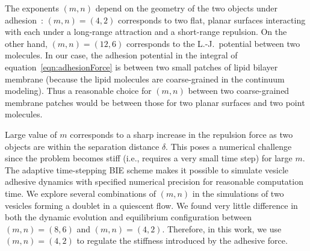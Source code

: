 \documentclass[prf,superscriptaddress,showpacs]{revtex4-1}
\begin{document}
The exponents $(m,n)$ depend on the geometry of the two objects under
adhesion~\cite{Book_IntermolecularSurfaceForces}: $(m,n)=(4,2)$
corresponds to two flat, planar surfaces interacting with each under a
long-range attraction and a short-range repulsion. On the other hand,
$(m,n) = (12,6)$ corresponds to the L.-J.~potential between two molecules.
In our case, the adhesion potential in the integral of
equation~\eqref{eqn:adhesionForce} is between two small patches of lipid
bilayer membrane (because the lipid molecules are coarse-grained in the
continuum modeling).  Thus a reasonable choice for $(m,n)$ between two
coarse-grained membrane patches would be between those for two planar
surfaces and two point molecules. 
 
Large value of $m$ corresponds to a sharp increase in the repulsion
force as two objects are within the separation distance $\delta$.  This
poses a numerical challenge since the problem becomes stiff (i.e.,
requires a very small time step) for large $m$.  The adaptive
time-stepping BIE scheme makes it possible to simulate vesicle adhesive
dynamics with specified numerical precision for reasonable computation
time.  We explore several combinations of $(m,n)$ in the simulations of
two vesicles forming a doublet in a quiescent flow.  We found very
little difference in both the dynamic evolution and equilibrium
configuration between $(m,n)=(8,6)$ and $(m,n)=(4,2)$.  Therefore, in
this work, we use $(m,n) = (4,2)$ to regulate the stiffness introduced
by the adhesive force.

\end{document}

